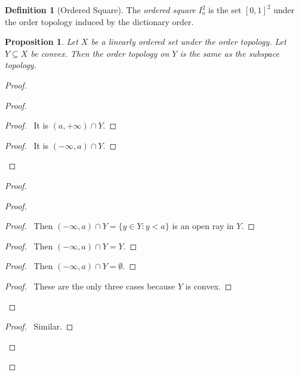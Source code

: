 \documentclass{book}
\let\qed\relax
\newtheorem{prop}[ax]{Proposition}
\theoremstyle{definition}
\newtheorem{df}[ax]{Definition}
\begin{document}
\begin{df}[Ordered Square]
The \emph{ordered square} $I_o^2$ is the set $[0,1]^2$ under the order topology induced by the dictionary order.
\end{df}

\begin{prop}
Let $X$ be a linearly ordered set under the order topology. Let $Y \subseteq X$ be convex. Then the order topology on $Y$ is the same as the subspace topology.
\end{prop}

\begin{proof}
\pf
{}
\begin{proof}
	\begin{proof}
		\pf\ It is $(a, +\infty) \cap Y$.
	\end{proof}
	\begin{proof}
		\pf\ It is $(-\infty, a) \cap Y$.
	\end{proof}
\end{proof}
\begin{proof}
	\begin{proof}
		\begin{proof}
			\pf\ Then $(-\infty, a) \cap Y = \{ y \in Y : y < a\}$ is an open ray in $Y$.
		\end{proof}
		\begin{proof}
			\pf\ Then $(-\infty, a) \cap Y = Y$. 
		\end{proof}
		\begin{proof}
			\pf\ Then $(-\infty, a) \cap Y = \emptyset$. 
		\end{proof}
		\qedstep
		\begin{proof}
			\pf\ These are the only three cases because $Y$ is convex.
		\end{proof}
	\end{proof}
	\begin{proof}
		\pf\ Similar.
	\end{proof}
\end{proof}
\qed
\end{proof}
\end{document}

